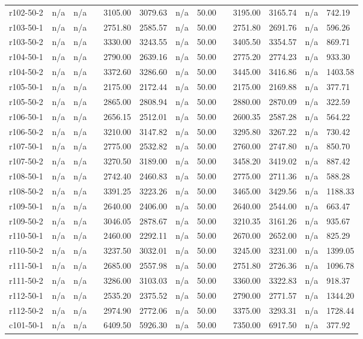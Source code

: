 \documentclass[final,5p,times,twocolumn]{elsarticle}
\begin{document}
{{{{{{{{{{{{{\begin{longtable}{l l l l l l l l l l l l l}
r102-50-2& n/a& n/a&&3105.00& 3079.63& n/a& 50.00&&3195.00& 3165.74& n/a& 742.19\\
r103-50-1& n/a& n/a&&2751.80& 2585.57& n/a& 50.00&&2751.80& 2691.76& n/a& 596.26\\
r103-50-2& n/a& n/a&&3330.00& 3243.55& n/a& 50.00&&3405.50& 3354.57& n/a& 869.71\\
r104-50-1& n/a& n/a&&2790.00& 2639.16& n/a& 50.00&&2775.20& 2774.23& n/a& 933.30\\
r104-50-2& n/a& n/a&&3372.60& 3286.60& n/a& 50.00&&3445.00& 3416.86& n/a& 1403.58\\
r105-50-1& n/a& n/a&&2175.00& 2172.44& n/a& 50.00&&2175.00& 2169.88& n/a& 377.71\\
r105-50-2& n/a& n/a&&2865.00& 2808.94& n/a& 50.00&&2880.00& 2870.09& n/a& 322.59\\
r106-50-1& n/a& n/a&&2656.15& 2512.01& n/a& 50.00&&2600.35& 2587.28& n/a& 564.22\\
r106-50-2& n/a& n/a&&3210.00& 3147.82& n/a& 50.00&&3295.80& 3267.22& n/a& 730.42\\
r107-50-1& n/a& n/a&&2775.00& 2532.82& n/a& 50.00&&2760.00& 2747.80& n/a& 850.70\\
r107-50-2& n/a& n/a&&3270.50& 3189.00& n/a& 50.00&&3458.20& 3419.02& n/a& 887.42\\
r108-50-1& n/a& n/a&&2742.40& 2460.83& n/a& 50.00&&2775.00& 2711.36& n/a& 588.28\\
r108-50-2& n/a& n/a&&3391.25& 3223.26& n/a& 50.00&&3465.00& 3429.56& n/a& 1188.33\\
r109-50-1& n/a& n/a&&2640.00& 2406.00& n/a& 50.00&&2640.00& 2544.00& n/a& 663.47\\
r109-50-2& n/a& n/a&&3046.05& 2878.67& n/a& 50.00&&3210.35& 3161.26& n/a& 935.67\\
r110-50-1& n/a& n/a&&2460.00& 2292.11& n/a& 50.00&&2670.00& 2652.00& n/a& 825.29\\
r110-50-2& n/a& n/a&&3237.50& 3032.01& n/a& 50.00&&3245.00& 3231.00& n/a& 1399.05\\
r111-50-1& n/a& n/a&&2685.00& 2557.98& n/a& 50.00&&2751.80& 2726.36& n/a& 1096.78\\
r111-50-2& n/a& n/a&&3286.00& 3103.03& n/a& 50.00&&3360.00& 3322.83& n/a& 918.37\\
r112-50-1& n/a& n/a&&2535.20& 2375.52& n/a& 50.00&&2790.00& 2771.57& n/a& 1344.20\\
r112-50-2& n/a& n/a&&2974.90& 2772.06& n/a& 50.00&&3375.00& 3293.31& n/a& 1728.44\\
c101-50-1& n/a& n/a&&6409.50& 5926.30& n/a& 50.00&&7350.00& 6917.50& n/a& 377.92\\

\end{longtable}}}}}}}}}}}}}}
\end{document}
